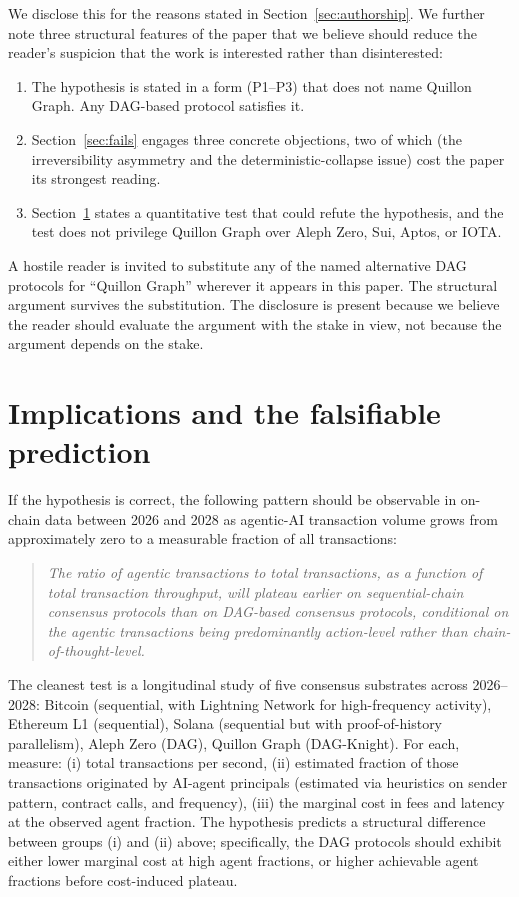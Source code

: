 \documentclass[11pt,a4paper]{article}
\begin{document}
We disclose this for the reasons stated in Section~\ref{sec:authorship}.
We further note three structural features of the paper that we believe
should reduce the reader's suspicion that the work is interested rather
than disinterested:
\begin{enumerate}[label=(\alph*),leftmargin=2em]
  \item The hypothesis is stated in a form (P1--P3) that does not name
  Quillon Graph. Any DAG-based protocol satisfies it.
  \item Section~\ref{sec:fails} engages three concrete objections, two of
  which (the irreversibility asymmetry and the deterministic-collapse
  issue) cost the paper its strongest reading.
  \item Section~\ref{sec:falsify} states a quantitative test that could
  refute the hypothesis, and the test does not privilege Quillon Graph
  over Aleph Zero, Sui, Aptos, or IOTA.
\end{enumerate}
A hostile reader is invited to substitute any of the named alternative
DAG protocols for ``Quillon Graph'' wherever it appears in this paper.
The structural argument survives the substitution. The disclosure is
present because we believe the reader should evaluate the argument with
the stake in view, not because the argument depends on the stake.

\section{Implications and the falsifiable prediction}\label{sec:falsify}

If the hypothesis is correct, the following pattern should be observable
in on-chain data between 2026 and 2028 as agentic-AI transaction volume
grows from approximately zero to a measurable fraction of all
transactions:
\begin{quote}\itshape
The ratio of agentic transactions to total transactions, as a function
of total transaction throughput, will plateau earlier on sequential-chain
consensus protocols than on DAG-based consensus protocols, conditional
on the agentic transactions being predominantly action-level rather than
chain-of-thought-level.
\end{quote}

The cleanest test is a longitudinal study of five consensus substrates
across 2026--2028: Bitcoin (sequential, with Lightning Network for
high-frequency activity), Ethereum L1 (sequential), Solana (sequential
but with proof-of-history parallelism), Aleph Zero (DAG), Quillon Graph
(DAG-Knight). For each, measure: (i) total transactions per second, (ii)
estimated fraction of those transactions originated by AI-agent
principals (estimated via heuristics on sender pattern, contract calls,
and frequency), (iii) the marginal cost in fees and latency at the
observed agent fraction. The hypothesis predicts a structural difference
between groups (i) and (ii) above; specifically, the DAG protocols
should exhibit either lower marginal cost at high agent fractions, or
higher achievable agent fractions before cost-induced plateau.
\end{document}
